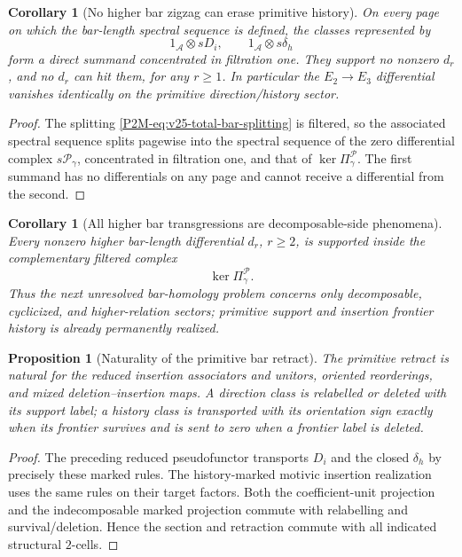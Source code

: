 \documentclass[11pt]{article}
\newtheorem{proposition}[theorem]{Proposition}
\newtheorem{corollary}[theorem]{Corollary}
\theoremstyle{remark}
\begin{document}
\begin{corollary}[No higher bar zigzag can erase primitive history]
\label{P2M-cor:v25-no-higher-zigzag}
On every page on which the bar-length spectral sequence is defined, the
classes represented by
\[
 1_{\mathscr A}\otimes sD_i,
 \qquad
 1_{\mathscr A}\otimes s\delta_h
\]
form a direct summand concentrated in filtration one.  They support no
nonzero \(d_r\), and no \(d_r\) can hit them, for any \(r\ge1\).
In particular the \(E_2\to E_3\) differential vanishes identically on the
primitive direction/history sector.
\end{corollary}

\begin{proof}
The splitting \eqref{P2M-eq:v25-total-bar-splitting} is filtered, so the associated
spectral sequence splits pagewise into the spectral sequence of the zero
differential complex \(s\mathscr P_\gamma\), concentrated in filtration one,
and that of \(\ker\Pi_\gamma^{\mathscr P}\).  The first summand has no
differentials on any page and cannot receive a differential from the second.
\end{proof}

\begin{corollary}[All higher bar transgressions are decomposable-side phenomena]
\label{P2M-cor:v25-higher-transgression-kernel}
Every nonzero higher bar-length differential \(d_r\), \(r\ge2\), is supported
inside the complementary filtered complex
\[
 \boxed{\ker\Pi_\gamma^{\mathscr P}.}
\]
Thus the next unresolved bar-homology problem concerns only decomposable,
cyclicized, and higher-relation sectors; primitive support and insertion
frontier history is already permanently realized.
\end{corollary}

\begin{proposition}[Naturality of the primitive bar retract]
\label{P2M-prop:v25-primitive-retract-naturality}
The primitive retract is natural for the reduced insertion associators and
unitors, oriented reorderings, and mixed deletion--insertion maps.  A direction
class is relabelled or deleted with its support label; a history class is
transported with its orientation sign exactly when its frontier survives and
is sent to zero when a frontier label is deleted.
\end{proposition}

\begin{proof}
The preceding reduced pseudofunctor transports \(D_i\) and the closed
\(\delta_h\) by precisely these marked rules.  The history-marked motivic insertion
realization uses the same rules on their target factors.  Both the
coefficient-unit projection and the indecomposable marked projection commute
with relabelling and survival/deletion.  Hence the section and retraction
commute with all indicated structural \(2\)-cells.
\end{proof}
\end{document}
